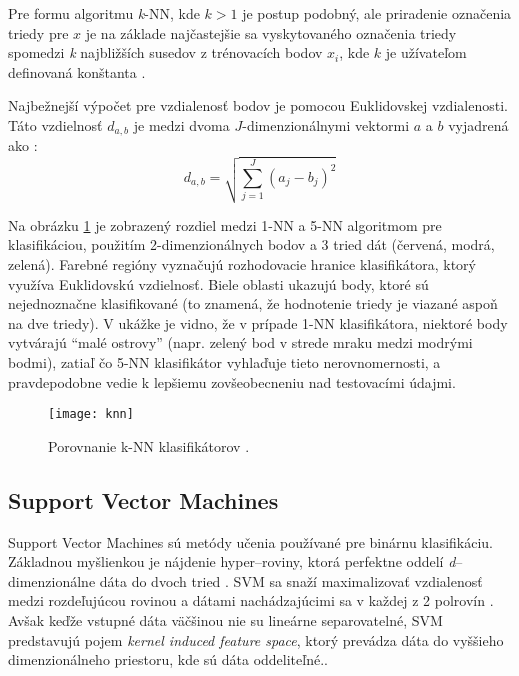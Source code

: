 Pre formu algoritmu \textit{k}-NN, kde $k > 1$ je postup podobný, ale priradenie označenia triedy pre $x$ je na základe najčastejšie sa vyskytovaného označenia triedy
spomedzi \textit{k} najbližších susedov z trénovacích bodov $x_i$, kde $k$ je užívateľom definovaná konštanta \cite{prop:KnnClassification}.

Najbežnejší výpočet pre vzdialenosť bodov je pomocou Euklidovskej vzdialenosti.
Táto vzdielnosť $d_{a,b}$ je medzi dvoma $J$-dimenzionálnymi vektormi $a$ a $b$ vyjadrená ako \cite{prop:KnnClassification}:
\begin{equation}
    \label{eq:euclidMetric}
    d_{a,b} = \sqrt{\sum_{j=1}^{J}{(a_j - b_j)^2}}
\end{equation}

Na obrázku \ref{pic:kNN} je zobrazený rozdiel medzi 1-NN a 5-NN algoritmom pre klasifikáciou,
    použitím 2-dimenzionálnych bodov a 3 tried dát (červená, modrá, zelená).
Farebné regióny vyznačujú rozhodovacie hranice klasifikátora, ktorý využíva Euklidovskú vzdielnosť.
Biele oblasti ukazujú body, ktoré sú nejednoznačne klasifikované (to znamená, že hodnotenie triedy je viazané aspoň na dve triedy).
V ukážke je vidno, že v prípade 1-NN klasifikátora, niektoré body vytvárajú ``malé ostrovy''
    (napr. zelený bod v strede mraku medzi modrými bodmi), zatiaľ čo 5-NN klasifikátor vyhlaďuje tieto nerovnomernosti,
    a pravdepodobne vedie k lepšiemu zovšeobecneniu nad testovacími údajmi.

\begin{figure}[H]
	\centering
	\texttt{[image: knn]}
	\caption{Porovnanie k-NN klasifikátorov \cite{odkaz:KnnImage}.}
	\label{pic:kNN}
\end{figure}



\subsection{Support Vector Machines}
Support Vector Machines sú metódy učenia používané pre binárnu klasifikáciu.
Základnou myšlienkou je nájdenie hyper--roviny, ktorá perfektne oddelí \textit{d}--dimenzionálne dáta do dvoch tried \cite{prop:IntroductionToSVM}.
SVM sa snaží maximalizovať vzdialenosť medzi rozdeľujúcou rovinou a dátami nachádzajúcimi sa v každej z 2 polrovín \cite{prop:SupervisedMachineLearning}.
Avšak keďže vstupné dáta väčšinou nie su lineárne separovatelné, SVM predstavujú pojem \textit{kernel induced feature space},
    ktorý prevádza dáta do vyššieho dimenzionálneho priestoru, kde sú dáta oddeliteľné.\cite{prop:IntroductionToSVM}.

